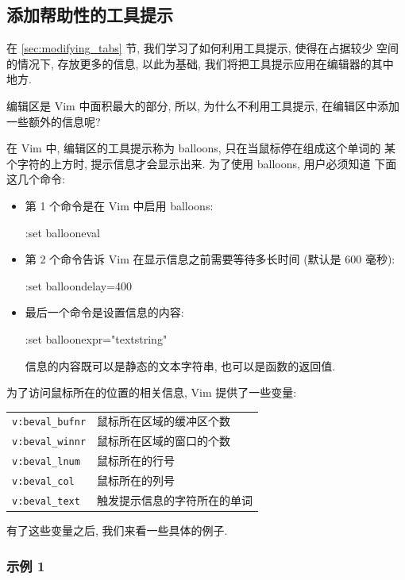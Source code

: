 \subsection{添加帮助性的工具提示}
\label{subsec:adding_helpful_tool_tips}

在 \ref{sec:modifying_tabs} 节, 我们学习了如何利用工具提示, 使得在占据较少
空间的情况下, 存放更多的信息, 以此为基础, 我们将把工具提示应用在编辑器的其中
地方.

编辑区是 Vim 中面积最大的部分, 所以, 为什么不利用工具提示, 在编辑区中添加
一些额外的信息呢?

在 Vim 中, 编辑区的工具提示称为 balloons, 只在当鼠标停在组成这个单词的
某个字符的上方时, 提示信息才会显示出来. 为了使用 balloons, 用户必须知道
下面这几个命令:
\begin{itemize}
    \item 第 1 个命令是在 Vim 中启用 balloons:
    \begin{vimcmd}
    :set ballooneval
    \end{vimcmd}
    \item 第 2 个命令告诉 Vim 在显示信息之前需要等待多长时间 (默认是 600
    毫秒):
    \begin{vimcmd}
    :set balloondelay=400
    \end{vimcmd}
    \item 最后一个命令是设置信息的内容:
    \begin{vimcmd}
    :set balloonexpr="textstring"
    \end{vimcmd}
    信息的内容既可以是静态的文本字符串, 也可以是函数的返回值.
\end{itemize}

为了访问鼠标所在的位置的相关信息, Vim 提供了一些变量:
\begin{center}
\begin{tabular}{ll}
    \hline
    \texttt{v:beval\_bufnr} & 鼠标所在区域的缓冲区个数 \\
    \texttt{v:beval\_winnr} & 鼠标所在区域的窗口的个数 \\
    \texttt{v:beval\_lnum}  & 鼠标所在的行号 \\
    \texttt{v:beval\_col}   & 鼠标所在的列号 \\
    \texttt{v:beval\_text}  & 触发提示信息的字符所在的单词 \\
    \hline
\end{tabular}
\end{center}
有了这些变量之后, 我们来看一些具体的例子.

\subsubsection{示例 1}
\label{subsubsec:example_1}

